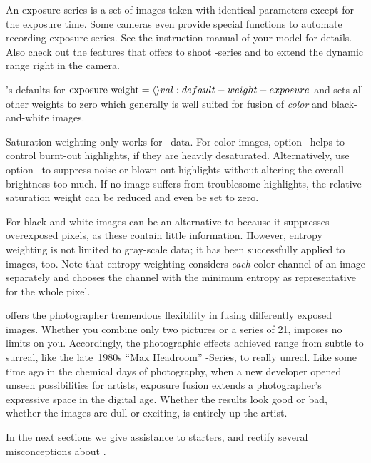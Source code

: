 
An exposure series is a set of images taken with identical parameters except for the exposure
time.  Some cameras even provide special functions to automate recording exposure series.  See
the instruction manual of your model for details.  Also check out the features that
 offers to shoot -series and to extend the
dynamic range right in the camera.

\App{}'s defaults for $\mbox{exposure weight} = \val*{val:default-weight-exposure}$ and sets all
other weights to zero which generally is well suited for fusion of \emph{color} and
black-and-white images.

Saturation weighting only works for ~data.  For color images,
option~ helps to control burnt-out highlights, if they are heavily
desaturated.  Alternatively, use option~ to suppress noise or
blown-out highlights without altering the overall brightness too much.  If no image suffers from
troublesome highlights, the relative saturation weight can be reduced and even be set to zero.

For black-and-white images  can be an alternative to
 because it suppresses overexposed pixels, as these contain little
information.  However, entropy weighting is not limited to gray-scale data; it has been
successfully applied to  images, too.  Note that entropy weighting considers
\emph{each} color channel of an  image separately and chooses the channel with the
minimum entropy as representative for the whole pixel.

\App{} offers the photographer tremendous flexibility in fusing differently exposed images.
Whether you combine only two pictures or a series of 21, \App{} imposes no limits on you.
Accordingly, the photographic effects achieved range from subtle to surreal, like the late~1980s
``Max Headroom'' -Series, to really unreal.  Like some time ago in the chemical days
of photography, when a new developer opened unseen possibilities for artists, exposure fusion
extends a photographer's expressive space in the digital age.  Whether the results look good or
bad, whether the images are dull or exciting, is entirely up the artist.

In the next sections we give assistance to starters, and rectify several misconceptions about
\App{}.


